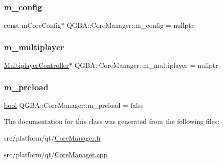 \subsubsection{\texorpdfstring{m\+\_\+config}{m\_config}}
{\footnotesize\ttfamily const m\+Core\+Config$\ast$ Q\+G\+B\+A\+::\+Core\+Manager\+::m\+\_\+config = nullptr\hspace{0.3cm}{\ttfamily [private]}}

\mbox{\label{class_q_g_b_a_1_1_core_manager_a73078dc59bc485fcfd945bf4a3b52c77}} 
\subsubsection{\texorpdfstring{m\+\_\+multiplayer}{m\_multiplayer}}
{\footnotesize\ttfamily \mbox{\hyperlink{class_q_g_b_a_1_1_multiplayer_controller}{Multiplayer\+Controller}}$\ast$ Q\+G\+B\+A\+::\+Core\+Manager\+::m\+\_\+multiplayer = nullptr\hspace{0.3cm}{\ttfamily [private]}}

\mbox{\label{class_q_g_b_a_1_1_core_manager_ac7e2bf905870fd80d6ac70029cb44a67}} 
\subsubsection{\texorpdfstring{m\+\_\+preload}{m\_preload}}
{\footnotesize\ttfamily \mbox{\hyperlink{libretro_8h_a4a26dcae73fb7e1528214a068aca317e}{bool}} Q\+G\+B\+A\+::\+Core\+Manager\+::m\+\_\+preload = false\hspace{0.3cm}{\ttfamily [private]}}



The documentation for this class was generated from the following files\+:\begin{DoxyCompactItemize}
\item 
src/platform/qt/\mbox{\hyperlink{_core_manager_8h}{Core\+Manager.\+h}}\item 
src/platform/qt/\mbox{\hyperlink{_core_manager_8cpp}{Core\+Manager.\+cpp}}\end{DoxyCompactItemize}
